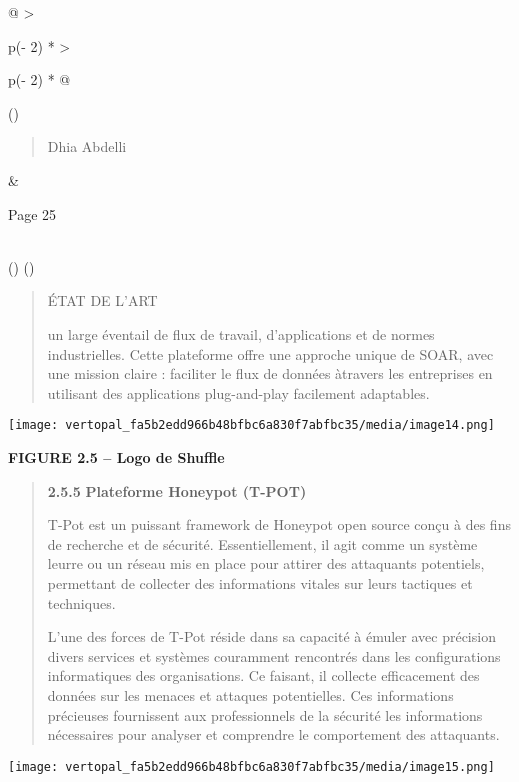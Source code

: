 \documentclass[
]{article}
\begin{document}
\begin{longtable}[]{@{}
  >{\raggedright\arraybackslash}p{(\columnwidth - 2\tabcolsep) * }
  >{\raggedright\arraybackslash}p{(\columnwidth - 2\tabcolsep) * }@{}}
\toprule()
\begin{minipage}[b]{\linewidth}\raggedright
\begin{quote}
Dhia Abdelli
\end{quote}
\end{minipage} & \begin{minipage}[b]{\linewidth}\raggedright
Page 25
\end{minipage} \\
\midrule()
\endhead
\bottomrule()
\end{longtable}

\begin{quote}
ÉTAT DE L'ART

un large éventail de flux de travail, d'applications et de normes
industrielles. Cette plateforme offre une approche unique de SOAR, avec
une mission claire : faciliter le flux de données àtravers les
entreprises en utilisant des applications plug-and-play facilement
adaptables.
\end{quote}

\texttt{[image: vertopal\_fa5b2edd966b48bfbc6a830f7abfbc35/media/image14.png]}

\textbf{FIGURE 2.5 -- Logo de Shuffle}

\begin{quote}
\textbf{2.5.5} \textbf{Plateforme Honeypot (T-POT)}

T-Pot est un puissant framework de Honeypot open source conçu à des fins
de recherche et de sécurité. Essentiellement, il agit comme un système
leurre ou un réseau mis en place pour attirer des attaquants potentiels,
permettant de collecter des informations vitales sur leurs tactiques et
techniques.

L'une des forces de T-Pot réside dans sa capacité à émuler avec
précision divers services et systèmes couramment rencontrés dans les
configurations informatiques des organisations. Ce faisant, il collecte
efficacement des données sur les menaces et attaques potentielles. Ces
informations précieuses fournissent aux professionnels de la sécurité
les informations nécessaires pour analyser et comprendre le comportement
des attaquants.
\end{quote}

\texttt{[image: vertopal\_fa5b2edd966b48bfbc6a830f7abfbc35/media/image15.png]}
\end{document}
